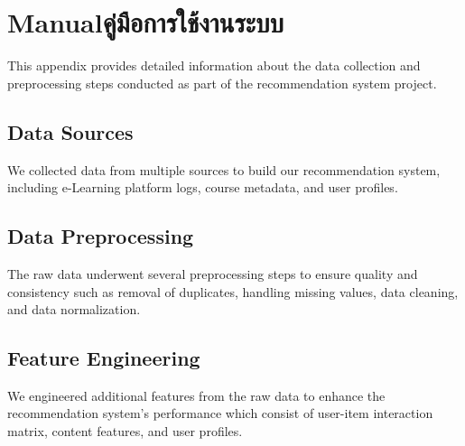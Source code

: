 








\chapter{\ifenglish Manual\else คู่มือการใช้งานระบบ\fi}

This appendix provides detailed information about the data collection and 
preprocessing steps conducted as part of the recommendation system project.

\section{Data Sources}

We collected data from multiple sources to build our recommendation system, including 
e-Learning platform logs, course metadata, and user profiles.

\section{Data Preprocessing}

The raw data underwent several preprocessing steps to ensure quality and consistency 
such as removal of duplicates, handling missing values, data cleaning, and data normalization.

\section{Feature Engineering}

We engineered additional features from the raw data to enhance the recommendation system's 
performance which consist of user-item interaction matrix, content features, and user profiles.

